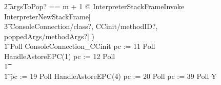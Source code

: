 \begin{figure}[p!]
\begin{circus}
    \t2 \lschexpract \exists argsToPop? == m + 1 @ InterpreterStackFrameInvoke \rschexpract \circseq \lschexpract InterpreterNewStackFrame[\\
    \t3 ConsoleConnection/class?, CCinit/methodID?, poppedArgs/methodArgs?] \rschexpract) \circseq \\
    \t1 Poll \circseq ConsoleConnection\_CCinit \circseq pc := 11 \circseq Poll \circseq HandleAstoreEPC(1) \circseq pc := 12 \circseq Poll \circseq \\
    \t1 {} \cdots {} \\
    \t1 pc := 19 \circseq Poll \circseq HandleAstoreEPC(4) \circseq pc := 20 \circseq Poll \circseq pc := 39 \circseq  Poll \circseq \circmu Y \circspot \\

\end{circus}
\end{figure}
